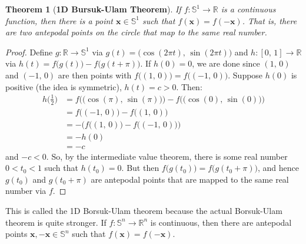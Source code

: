 \documentclass{article}
\theoremstyle{plain}
\newtheorem{theorem}{Theorem}[section]
\theoremstyle{normal}
\begin{document}
         \begin{theorem}[\textbf{1D Bursuk-Ulam Theorem}]
            If $f:\mathbb{S}^{1}\rightarrow\mathbb{R}$ is a continuous
            function, then there is a point $\mathbf{x}\in\mathbb{S}^{1}$ such
            that $f(\mathbf{x})=f(-\mathbf{x})$. That is, there are two
            antepodal points on the circle that map to the same real number.
         \end{theorem}
         \begin{proof}
            Define $g:\mathbb{R}\rightarrow\mathbb{S}^{1}$ via
            $g(t)=\big(\cos(2\pi{t}),\,\sin(2\pi{t})\big)$ and
            $h:[0,\,1]\rightarrow\mathbb{R}$ via
            $h(t)=f\big(g(t)\big)-f\big(g(t+\pi)\big)$. If $h(0)=0$, we
            are done since $(1,\,0)$ and $(-1,\,0)$ are then points with
            $f\big((1,\,0)\big)=f\big((-1,\,0)\big)$. Suppose $h(0)$ is positive
            (the idea is symmetric), $h(t)=c>0$. Then:
            \begin{align}
                h\big(\frac{1}{2}\big)
                &=f\Big(\big(\cos(\pi),\,\sin(\pi)\big)\Big)-
                    f\big(\big(\cos(0),\,\sin(0)\big)\Big)\\
                &=f\big((-1,\,0)\big)-f\big((1,\,0)\big)\\
                &=-\Big(f\big((1,\,0)\big)-f\big((-1,\,0)\big)\Big)\\
                &=-h(0)\\
                &=-c
            \end{align}
            and $-c<0$. So, by the intermediate value theorem, there is some
            real number $0<t_{0}<1$ such that $h(t_{0})=0$. But then
            $f\big(g(t_{0})\big)=f\big(g(t_{0}+\pi)\big)$, and hence
            $g(t_{0})$ and $g(t_{0}+\pi)$ are antepodal points that are mapped
            to the same real number via $f$. 
         \end{proof}
         This is called the 1D Borsuk-Ulam theorem because the actual
         Borsuk-Ulam theorem is quite stronger. If
         $f:\mathbb{S}^{n}\rightarrow\mathbb{R}^{n}$ is continuous, then there
         are antepodal points $\mathbf{x},-\mathbf{x}\in\mathbb{S}^{n}$ such
         that $f(\mathbf{x})=f(-\mathbf{x})$.
\end{document}
